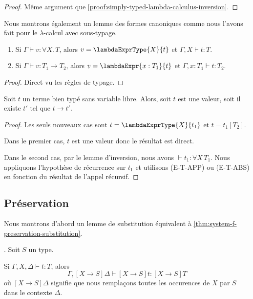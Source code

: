 \begin{proof}
  Même argument que \ref{proof:simply-typed-lambda-calculus-inversion}.
\end{proof}

Nous montrons également un lemme des formes canoniques comme nous l'avons fait
pour le $\lambda$-calcul avec sous-typage.

\begin{lemma} 
  \begin{enumerate}
  \item Si $\Gamma \vdash v : \forall X . \, T$, alors $v =
    \lambdaExprType{X}{t}$ et $\Gamma, X \vdash t : T$.
  \item Si $\Gamma \vdash v : T_{1} \rightarrow T_{2}$, alors $v =
    \lambdaExpr{x : T_{1}}{t}$ et $\Gamma, x : T_{1} \vdash t : T_{2}$.
  \end{enumerate}
\end{lemma}

\begin{proof}
  Direct vu les règles de typage.
\end{proof}

\begin{theorem} [de progression]
  Soit $t$ un terme bien typé sans variable libre. Alors, soit $t$ est une
  valeur, soit il existe $t'$ tel que $t \rightarrow t'$.
\end{theorem}

\begin{proof}
  Les seuls nouveaux cas sont $t = \lambdaExprType{X}{t_{1}}$ et $t =
  t_{1}[T_{2}]$.

  Dans le premier cas, $t$ est une valeur donc le résultat est direct.

  Dans le second cas, par le lemme d'inversion, nous avons $\vdash t_{1} :
  \forall X \, T_{1}$. Nous appliquons l'hypothèse de récurrence sur $t_{1}$ et
  utilisons (E-T-APP) ou (E-T-ABS) en fonction du résultat de l'appel récursif.
\end{proof}

\subsection*{Préservation}

Nous montrons d'abord un lemme de substitution équivalent à
\ref{thm:system-f-preservation-substitution}.

\begin{lemma} 
  \label{thm:system-f-preservation-substitution-type}.
  Soit $S$ un type.

  Si $\Gamma, X, \Delta \vdash t : T$, alors
  \begin{equation}
    \Gamma, [X \rightarrow S]\Delta \vdash [X \rightarrow S]t : [X \rightarrow S] T 
  \end{equation}
  où $[X \rightarrow S]\Delta$ signifie que nous remplaçons toutes les
  occurences de $X$ par $S$ dans le contexte $\Delta$.
\end{lemma}

